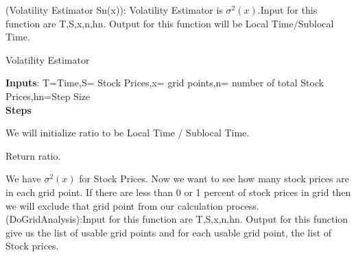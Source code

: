 \begin{enumerate}
(Volatility Estimator Sn(x)): Volatility Estimator is $\sigma^2(x)$.Input for this function are T,S,x,n,hn.
 Output for this function will be Local Time$/$Sublocal Time.
  \begin{algorithm}
  \caption{Volatility Estimator}
  \bigskip
  \textbf{Inputs}: T=Time,S= Stock Prices,x= grid points,n= number of total Stock Prices,hn=Step Size\\
  \textbf{Steps}
  \begin{algorithmic}[1]
  \item We will initialize ratio to be Local Time / Sublocal Time.
  \item Return ratio.
  \end{algorithmic}
  \end{algorithm}
 We have $\sigma^2(x)$ for Stock Prices. Now we want to see how many stock prices are in each grid point. 
 If there are less than 0 or 1 percent of stock prices in grid then we will exclude that grid point from
 our calculation process.
  (DoGridAnalysis):Input for this function are T,S,x,n,hn.
 Output for this function give us the list of usable grid points and for each usable grid point, the list of Stock prices.

\end{enumerate}
